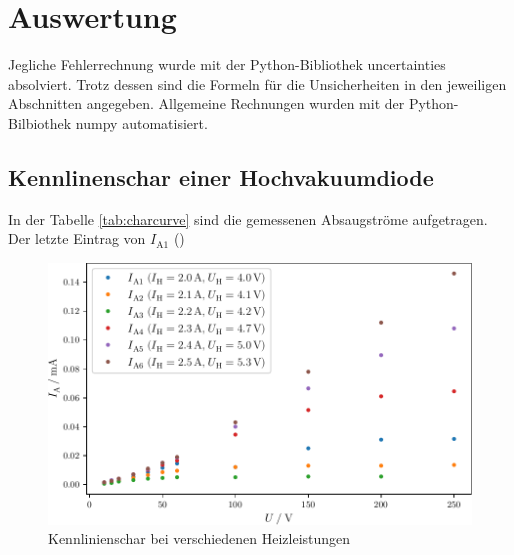 \section{Auswertung}
\label{sec:Auswertung}
Jegliche Fehlerrechnung wurde mit der Python-Bibliothek uncertainties \cite{uncertainties} absolviert. Trotz dessen sind die Formeln für
die Unsicherheiten in den jeweiligen Abschnitten angegeben. Allgemeine Rechnungen wurden mit der Python-Bilbiothek numpy \cite{numpy} automatisiert.
\subsection{Kennlinenschar einer Hochvakuumdiode}
In der Tabelle \ref{tab:charcurve} sind die gemessenen Absaugströme aufgetragen. Der letzte Eintrag von $I_{\text{A}1}$ ()
\begin{figure}
    \centering
    \caption{Kennlinienschar bei verschiedenen Heizleistungen}
    \label{fig:charcurve}
    \includegraphics[width = \textwidth]{build/charcurve.pdf}
\end{figure}
